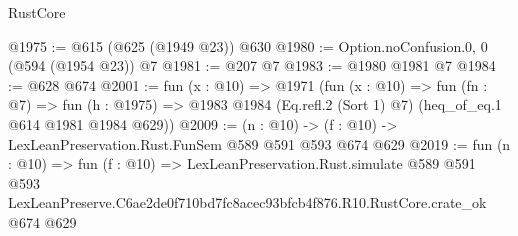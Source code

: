 \begin{lexlean}{RustCore}
\begin{coremodule}
@1975 := @615 (@625 (@1949 @23)) @630
@1980 := Option.noConfusion.{0, 0} (@594 (@1954 @23)) @7
@1981 := @207 @7
@1983 := @1980 @1981 @7
@1984 := @628 @674
@2001 := fun (x : @10) =>
  @1971
    (fun (x : @10) =>
    fun (fn : @7) =>
    fun (h : @1975) => @1983 @1984 (Eq.refl.{2} (Sort 1) @7) (heq_of_eq.{1} @614 @1981 @1984 @629))
@2009 := (n : @10) -> (f : @10) -> LexLeanPreservation.Rust.FunSem @589 @591 @593 @674 @629
@2019 := fun (n : @10) =>
  fun (f : @10) =>
  LexLeanPreservation.Rust.simulate
    @589
    @591
    @593
    LexLeanPreserve.C6ae2de0f710bd7fc8acec93bfcb4f876.R10.RustCore.crate_ok
    @674
    @629
\end{coremodule}
\end{lexlean}
